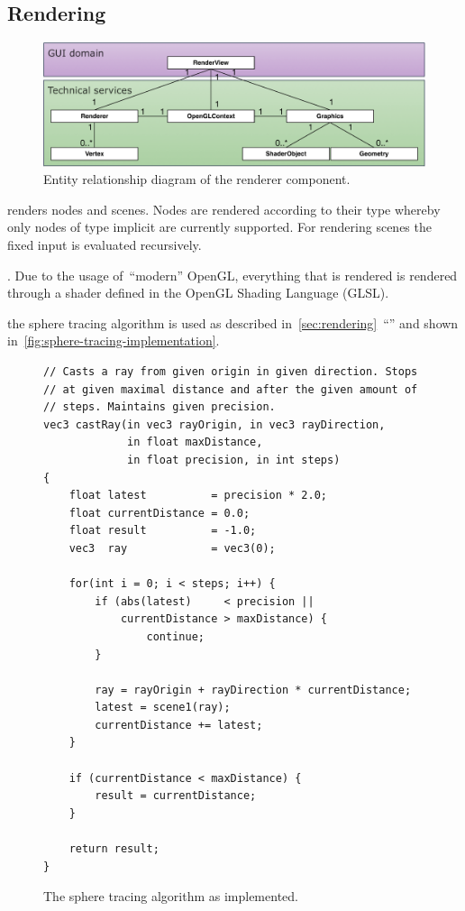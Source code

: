 \documentclass[%
    a4paper,    %
    justified,  %
    nobib,      %
    openany     %
]{tufte-book}
\makeatletter
\renewcommand{\label}[1]{\@tufte@label{##1}}%
\makeatother
\begin{document}
\subsection{Rendering}
\label{results:subsec:program:rendering}

\begin{figure}[!htbp]
  \caption{Entity relationship diagram of the renderer component.}
\label{fig:renderer-erd}
  \includegraphics[width=0.95\linewidth]{images/renderer-erd}
\end{figure}

 renders nodes and scenes. Nodes are
rendered according to their type whereby only nodes of type implicit are
currently supported. For rendering scenes the fixed input is evaluated
recursively.

. Due to the usage of~\enquote{modern}
OpenGL, everything that is rendered is rendered through a shader defined in the
OpenGL Shading Language (GLSL).

 the sphere tracing algorithm is used as
described in~\autoref{sec:rendering}~\enquote{}
and shown in~\cref{fig:sphere-tracing-implementation}.

\begin{figure}[!htbp]
  \begin{verbatim}
// Casts a ray from given origin in given direction. Stops
// at given maximal distance and after the given amount of
// steps. Maintains given precision.
vec3 castRay(in vec3 rayOrigin, in vec3 rayDirection,
             in float maxDistance,
             in float precision, in int steps)
{
    float latest          = precision * 2.0;
    float currentDistance = 0.0;
    float result          = -1.0;
    vec3  ray             = vec3(0);

    for(int i = 0; i < steps; i++) {
        if (abs(latest)     < precision ||
            currentDistance > maxDistance) {
                continue;
        }

        ray = rayOrigin + rayDirection * currentDistance;
        latest = scene1(ray);
        currentDistance += latest;
    }

    if (currentDistance < maxDistance) {
        result = currentDistance;
    }

    return result;
}
  \end{verbatim}
\caption{The sphere tracing algorithm as implemented.}
\label{fig:sphere-tracing-implementation}
\end{figure}
\end{document}
